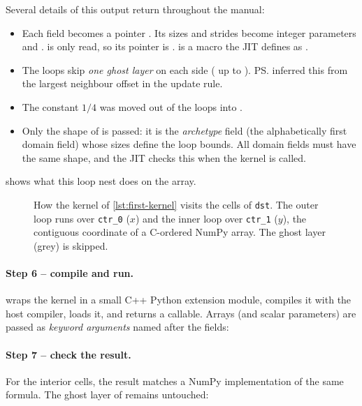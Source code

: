 
Several details of this output return throughout the manual:
\begin{itemize}
  \item Each field becomes a pointer . Its sizes and strides become
        integer parameters  and .
         is only read, so its pointer is .  is a
        macro the JIT defines as .
  \item The loops skip \emph{one ghost layer} on each side ( up to
        ). \ps{} inferred this from the largest neighbour offset
        in the update rule.
  \item The constant $1/4$ was moved out of the loops into .
  \item Only the shape of  is passed: it is the \emph{archetype} field (the
        alphabetically first domain field) whose sizes define the loop bounds. All domain
        fields must have the same shape, and the JIT checks this when the kernel is
        called.
\end{itemize}
 shows what this loop nest does on the array.

\begin{figure}[htbp]
  \centering
  
  \caption[How the first kernel traverses the array]{How the kernel of \cref{lst:first-kernel} visits the cells of \texttt{dst}. The outer loop runs over \texttt{ctr\_0} ($x$) and the inner loop over \texttt{ctr\_1} ($y$), the contiguous coordinate of a C-ordered NumPy array. The ghost layer (grey) is skipped.}
  \label{fig:sweep}
\end{figure}

\paragraph{Step 6 -- compile and run.}
 wraps the kernel in a small C++ Python extension module,
compiles it with the host compiler, loads it, and returns a callable. Arrays (and
scalar parameters) are passed as \emph{keyword arguments} named after the fields:

\paragraph{Step 7 -- check the result.}
For the interior cells, the result matches a NumPy implementation of the same formula.
The ghost layer of  remains untouched:

